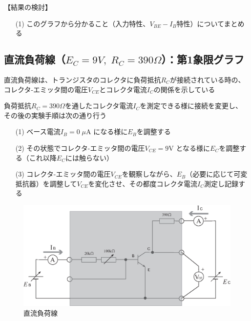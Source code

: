\documentclass[uplatex,a4paper,11pt,oneside,openany]{jsbook}
\begin{document}
【結果の検討】

\begin{enumerate}
	\item[(1)] このグラフから分かること（入力特性、$V_{BE}-I_B$特性）についてまとめる
\end{enumerate}

\newpage

\subsection{直流負荷線（$E_C=9V,\;R_C=390\Omega$）：第1象限グラフ}

直流負荷線は、トランジスタのコレクタに負荷抵抗$R_C$が接続されている時の、
コレクタ-エミッタ間の電圧$V_{CE}$とコレクタ電流$I_C$の関係を示している


負荷抵抗$R_C=390\Omega$を通したコレクタ電流$I_C$を測定できる様に接続を変更し、
その後の実験手順は次の通り行う

\begin{enumerate}
\item[(1)] ベース電流$I_B=0\;\mu$A になる様に$E_B$を調整する
\item[(2)] その状態でコレクタ-エミッタ間の電圧$V_{CE}=9$V となる様に$E_C$を調整する（これ以降$E_C$には触らない）
\item[(3)] コレクタ-エミッタ間の電圧$V_{CE}$を観察しながら、$E_B$（必要に応じて可変抵抗器）を調整して$V_{CE}$を変化させ、その都度コレクタ電流$I_C$測定し記録する  
\end{enumerate}



\begin{figure}[H]
  \centering
   \includegraphics[keepaspectratio, scale=0.45, angle=0]
               {figs/eps/ex4.eps}
               \caption{直流負荷線}
               \label{fig:ex3}
\end{figure}
\end{document}
